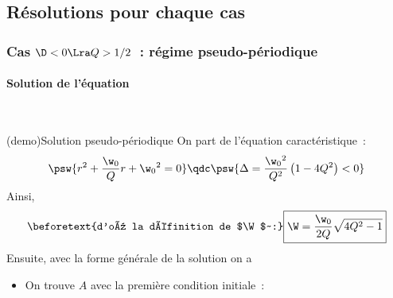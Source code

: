 \documentclass[../../main/main.tex]{subfiles}
\begin{document}
\subsection{Résolutions pour chaque cas}
\subsubsection{Cas $\D < 0 \Lra Q > 1/2$~: régime pseudo-périodique}
\paragraph{Solution de l'équation}
~ \smallbreak

\begin{tcb*}[label=demo:solupseudoper, breakable]
	(demo){Solution pseudo-périodique}
	On part de l'équation caractéristique~:
	\[
		\psw{%
			r^{2} + \frac{\w_0}{Q}r + \w_0{}^{2} = 0
		}%
		\qdc
		\psw{%
			\Delta = \frac{\w_0{}^{2}}{Q^{2}}\left( 1-4Q^{2} \right) < 0
		}%
	\]
	Ainsi,
	\vspace{-25pt}
	\vspace{-15pt}
	\begin{gather*}
		\beforetext{d'où la définition de $\W$~:}
		\boxed{\W = \frac{\w_0}{2Q}\sqrt{4Q^{2}-1}}
	\end{gather*}
	Ensuite, avec la forme générale de la solution on a
	\vspace{-15pt}
	\begin{itemize}
		\item On trouve $A$ avec la première condition initiale~:
		      \psw{%
			      \begin{gather*}

\end{gather*}}
\end{itemize}
\end{tcb*}
\end{document}
